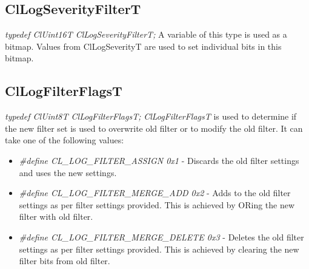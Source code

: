 \begin{flushleft}
\begin{itemize}
\subsection{ClLogSeverityFilterT}
\textit{typedef ClUint16T ClLogSeverityFilterT;}
\newline
\newline
A variable of this type is used as a bitmap. Values from ClLogSeverityT are used to set individual bits in this bitmap.




\subsection{ClLogFilterFlagsT}
\textit{typedef ClUint8T ClLogFilterFlagsT;}
\newline
\newline
\textit{ClLogFilterFlagsT} is used to determine if the new filter set is used to overwrite old filter or to
modify the old filter. It can take one of the following values:
\begin{itemize}
\item
\textit{#define CL_LOG_FILTER_ASSIGN 0x1} - Discards the old filter settings and uses the new settings.
\item
\textit{#define CL_LOG_FILTER_MERGE_ADD	0x2} - Adds to the old filter settings as per filter settings provided. This is achieved by ORing the new filter
with old filter.
\item
\textit{#define CL_LOG_FILTER_MERGE_DELETE 0x3} - Deletes the old filter settings as per filter settings provided. This is achieved by clearing the 
new filter bits from old filter.
\end{itemize}	



\end{itemize}
\end{flushleft}
